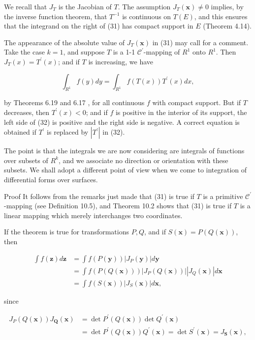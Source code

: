 \documentclass[10pt]{article}
\begin{document}
We recall that $J_{T}$ is the Jacobian of $T$. The assumption $J_{T}(\mathbf{x}) \neq 0$ implies, by the inverse function theorem, that $T^{-1}$ is continuous on $T(E)$, and this ensures that the integrand on the right of (31) has compact support in $E$ (Theorem 4.14).

The appearance of the absolute value of $J_{T}(\mathbf{x})$ in (31) may call for a comment. Take the case $k=1$, and suppose $T$ is a 1-1 $\mathscr{C}^{\prime}$-mapping of $R^{1}$ onto $R^{1}$. Then $J_{T}(x)=T^{\prime}(x)$; and if $T$ is increasing, we have

$$
\int_{R^{1}} f(y) d y=\int_{R^{1}} f(T(x)) T^{\prime}(x) d x,
$$

by Theorems 6.19 and 6.17 , for all continuous $f$ with compact support. But if $T$ decreases, then $T^{\prime}(x)<0$; and if $f$ is positive in the interior of its support, the left side of (32) is positive and the right side is negative. A correct equation is obtained if $T^{\prime}$ is replaced by $\left|T^{\prime}\right|$ in (32).

The point is that the integrals we are now considering are integrals of functions over subsets of $R^{k}$, and we associate no direction or orientation with these subsets. We shall adopt a different point of view when we come to integration of differential forms over surfaces.

Proof It follows from the remarks just made that (31) is true if $T$ is a primitive $\mathscr{C}^{\prime}$-mapping (see Definition 10.5), and Theorem 10.2 shows that (31) is true if $T$ is a linear mapping which merely interchanges two coordinates.

If the theorem is true for transformations $P, Q$, and if $S(\mathbf{x})=P(Q(\mathbf{x}))$, then

$$
\begin{aligned}
\int f(\mathbf{z}) d \mathbf{z} & =\int f(P(\mathbf{y}))\left|J_{P}(\mathbf{y})\right| d \mathbf{y} \\
& =\int f(P(Q(\mathbf{x})))\left|J_{P}(Q(\mathbf{x}))\right|\left|J_{Q}(\mathbf{x})\right| d \mathbf{x} \\
& =\int f(S(\mathbf{x}))\left|J_{S}(\mathbf{x})\right| d \mathbf{x},
\end{aligned}
$$

since

$$
\begin{aligned}
J_{P}(Q(\mathbf{x})) J_{\mathbf{Q}}(\mathbf{x}) & =\operatorname{det} P^{\prime}(Q(\mathbf{x})) \operatorname{det} Q^{\prime}(\mathbf{x}) \\
& =\operatorname{det} P^{\prime}(Q(\mathbf{x})) Q^{\prime}(\mathbf{x})=\operatorname{det} S^{\prime}(\mathbf{x})=J_{\mathbf{S}}(\mathbf{x}),
\end{aligned}
$$
\end{document}
